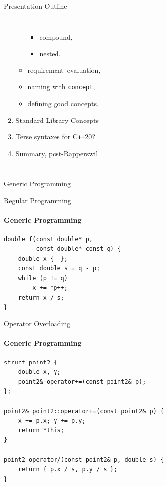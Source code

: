 \documentclass{beamer}
\begin{document}
\begin{frame}[fragile]{Presentation Outline}
\begin{columns}
\begin{enumerate}
\begin{itemize}
\begin{itemize}
                        \item compound,
                        \item nested.
                    \end{itemize}
                    \item requirement\, evaluation,
                    \item naming with \texttt{concept},
                    \item defining good concepts.
                \end{itemize}
                \item Standard Library Concepts
                \item Terse syntaxes for C\texttt{++}20?
                \item Summary, post-Rapperswil
            \end{enumerate}
        \end{columns}
    \end{frame}

    \begin{frame}[fragile]{Generic Programming}
    \end{frame}

    \begin{frame}[fragile]{Regular Programming}
        \framesubtitle{Generic Programming}
        \begin{center}
        \begin{lstlisting}[caption={a ``mysterious'' function; can you figure out what this code is?}]
double f(const double* p,
         const double* const q) {
    double x {  };
    const double s = q - p;
    while (p != q)
        x += *p++;
    return x / s;
} \end{lstlisting}
        \end{center}
    \end{frame}

    \begin{frame}[fragile]{Operator Overloading}
        \framesubtitle{Generic Programming}
        \begin{center}
        \begin{lstlisting}[caption={boilerplate for the next example; a very incomplete point class.}]
struct point2 {
    double x, y;
    point2& operator+=(const point2& p);
};

point2& point2::operator+=(const point2& p) {
    x += p.x; y += p.y;
    return *this;
}

point2 operator/(const point2& p, double s) {
    return { p.x / s, p.y / s };
} \end{lstlisting}
        \end{center}
    \end{frame}
\end{document}
